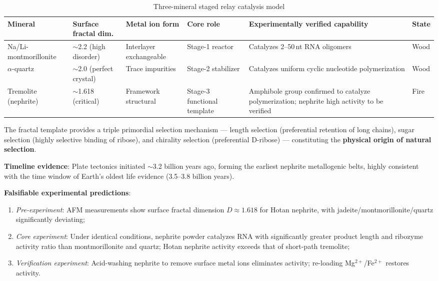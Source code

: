\documentclass[12pt,a4paper,twocolumn]{article}
\begin{document}
\begin{table}[H]
\centering
\footnotesize
\caption{Three-mineral staged relay catalysis model}
\label{tab:three_mineral_catalysis}
\begin{tabular}{p{1.8cm}|p{1.8cm}|p{2.2cm}|p{2.8cm}|p{2.5cm}|p{1.2cm}}
\hline
\textbf{Mineral} & \textbf{Surface fractal dim.} & \textbf{Metal ion form} & \textbf{Core role} & \textbf{Experimentally verified capability} & \textbf{State} \\
\hline
Na/Li-montmorillonite & $\sim$2.2 (high disorder) & Interlayer exchangeable & Stage-1 reactor & Catalyzes 2--50\,nt RNA oligomers & Wood \\
$\alpha$-quartz & $\sim$2.0 (perfect crystal) & Trace impurities & Stage-2 stabilizer & Catalyzes uniform cyclic nucleotide polymerization & Wood \\
Tremolite (nephrite) & $\sim$1.618 (critical) & Framework structural & Stage-3 functional template & Amphibole group confirmed to catalyze polymerization; nephrite high activity to be verified & Fire \\
\hline
\end{tabular}
\end{table}

The fractal template provides a triple primordial selection mechanism --- length selection (preferential retention of long chains), sugar selection (highly selective binding of ribose), and chirality selection (preferential D-ribose) --- constituting the \textbf{physical origin of natural selection}.

\textbf{Timeline evidence}: Plate tectonics initiated $\sim$3.2 billion years ago, forming the earliest nephrite metallogenic belts, highly consistent with the time window of Earth's oldest life evidence (3.5--3.8 billion years).

\textbf{Falsifiable experimental predictions}:
\begin{enumerate}
\item \textit{Pre-experiment}: AFM measurements show surface fractal dimension $D \approx 1.618$ for Hotan nephrite, with jadeite/montmorillonite/quartz significantly deviating;
\item \textit{Core experiment}: Under identical conditions, nephrite powder catalyzes RNA with significantly greater product length and ribozyme activity ratio than montmorillonite and quartz; Hotan nephrite activity exceeds that of short-path tremolite;
\item \textit{Verification experiment}: Acid-washing nephrite to remove surface metal ions eliminates activity; re-loading Mg$^{2+}$/Fe$^{2+}$ restores activity.
\end{enumerate}
\end{document}
